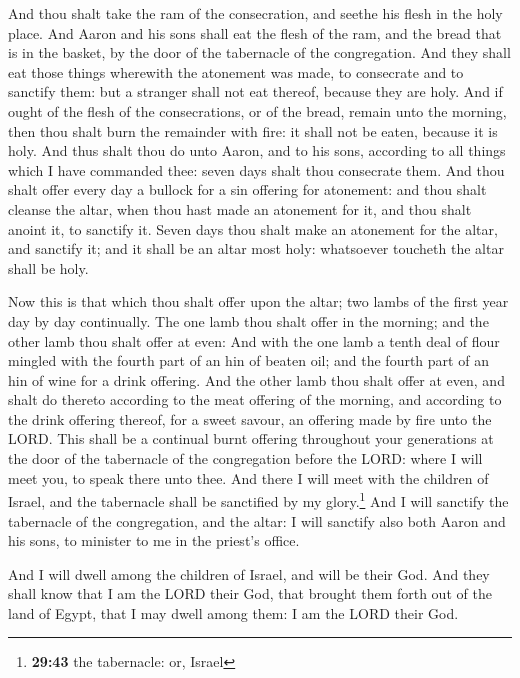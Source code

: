  And thou shalt take the ram of the consecration, and
seethe his flesh in the holy place.  And Aaron and his
sons shall eat the flesh of the ram, and the bread that is in the
basket, by the door of the tabernacle of the congregation.
 And they shall eat those things wherewith the atonement
was made, to consecrate and to sanctify them: but a stranger shall not
eat thereof, because they are holy.  And if ought of the
flesh of the consecrations, or of the bread, remain unto the morning,
then thou shalt burn the remainder with fire: it shall not be eaten,
because it is holy.  And thus shalt thou do unto Aaron,
and to his sons, according to all things which I have commanded thee:
seven days shalt thou consecrate them.  And thou shalt
offer every day a bullock for a sin offering for atonement: and thou
shalt cleanse the altar, when thou hast made an atonement for it, and
thou shalt anoint it, to sanctify it.  Seven days thou
shalt make an atonement for the altar, and sanctify it; and it shall be
an altar most holy: whatsoever toucheth the altar shall be holy.

 Now this is that which thou shalt offer upon the altar;
two lambs of the first year day by day continually.  The
one lamb thou shalt offer in the morning; and the other lamb thou shalt
offer at even:  And with the one lamb a tenth deal of
flour mingled with the fourth part of an hin of beaten oil; and the
fourth part of an hin of wine for a drink offering.  And
the other lamb thou shalt offer at even, and shalt do thereto according
to the meat offering of the morning, and according to the drink offering
thereof, for a sweet savour, an offering made by fire unto the LORD.
 This shall be a continual burnt offering throughout your
generations at the door of the tabernacle of the congregation before the
LORD: where I will meet you, to speak there unto thee. 
And there I will meet with the children of Israel, and the tabernacle
shall be sanctified by my glory.\footnote{\textbf{29:43} the tabernacle:
  or, Israel}  And I will sanctify the tabernacle of the
congregation, and the altar: I will sanctify also both Aaron and his
sons, to minister to me in the priest's office.

 And I will dwell among the children of Israel, and will
be their God.  And they shall know that I am the LORD
their God, that brought them forth out of the land of Egypt, that I may
dwell among them: I am the LORD their God.

